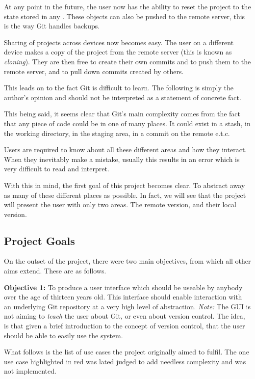 At any point in the future, the user now has the ability to reset the project to the state stored in any \commit. These objects can also be pushed to the remote server, this is the way Git handles backups. 

Sharing of projects across devices now becomes easy. The user on a different device makes a copy of the project from the remote server (this is known as \emph{cloning}). They are then free to create their own commits and to push them to the remote server, and to pull down commits created by others.

This leads on to the fact Git is difficult to learn. The following is simply the author's opinion and should not be interpreted as a statement of concrete fact.

This being said, it seems clear that Git's main complexity comes from the fact that any piece of code could be in one of many places. It could exist in a stash, in the working directory, in the staging area, in a commit on the remote e.t.c.

Users are required to know about all these different areas and how they interact. When they inevitably make a mistake, usually this results in an error which is very difficult to read and interpret. 

With this in mind, the first goal of this project becomes clear. To abstract away as many of these different places as possible. In fact, we will see that the project will present the user with only two areas. The remote version, and their local version.

\subsection{Project Goals}\label{sec:projectgoals}

On the outset of the project, there were two main objectives, from which all other aims extend. These are as follows.

\noindent \textbf{Objective 1:} To produce a user interface which should be useable by anybody over the age of thirteen years old. This interface should enable interaction with an underlying Git repository at a very high level of abstraction. \emph{Note:} The GUI is not aiming to \emph{teach} the user about Git, or even about version control. The idea, is that given a brief introduction to the concept of version control, that the user should be able to easily use the system.

What follows is the list of use cases the project originally aimed to fulfil. The one use case highlighted in red was lated judged to add needless complexity and was not implemented.

